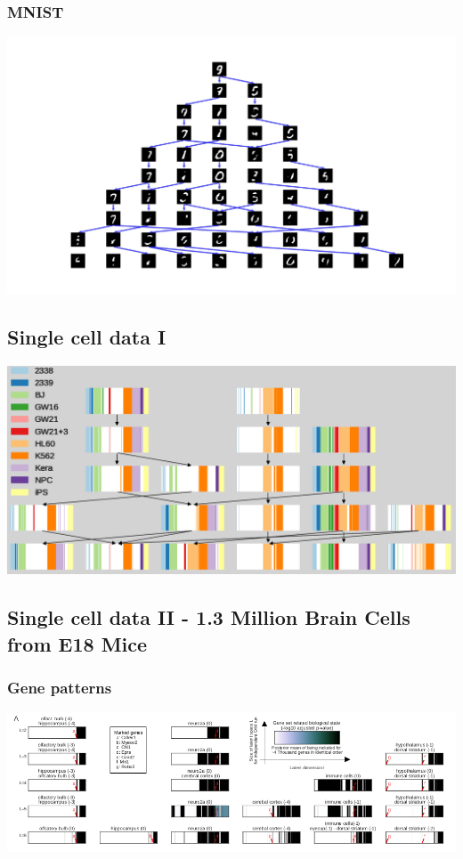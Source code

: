 \documentclass[11pt]{article}
\begin{document}
\subsubsection*{MNIST}
\label{sec-4-4-1}
\includegraphics[width=.9\linewidth]{./mnist_hierarchy.png}
\subsection*{Single cell data I}
\label{sec-4-5}
\includegraphics[width=.9\linewidth]{./sc_hierarchy.png}
\subsection*{Single cell data II - 1.3 Million Brain Cells from E18 Mice}
\label{sec-4-6}
\subsubsection*{Gene patterns}
\label{sec-4-6-1}
\includegraphics[width=.9\linewidth]{./mice_neurons1.png}
\end{document}

